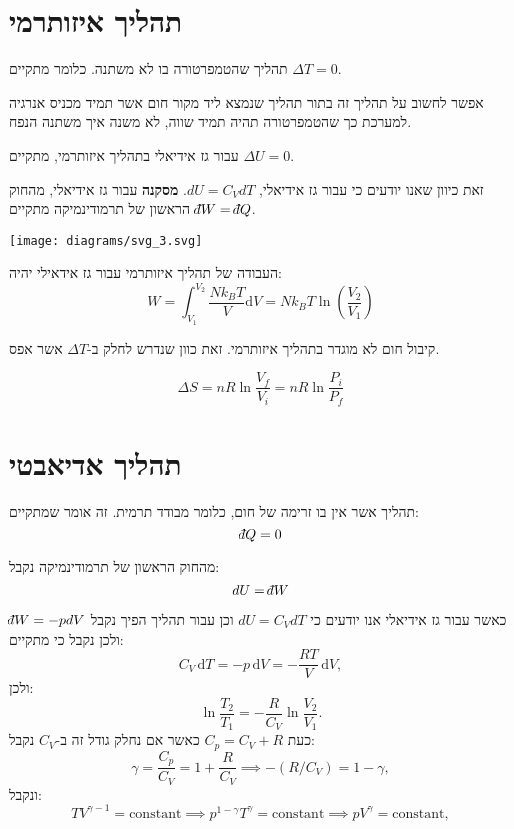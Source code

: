 \documentclass{tstextbook}
\begin{document}
\section{תהליך איזותרמי}

\begin{definition}
תהליך שהטמפרטורה בו לא משתנה. כלומר מתקיים \(\Delta T=0\).

\end{definition}
אפשר לחשוב על תהליך זה בתור תהליך שנמצא ליד מקור חום אשר תמיד מכניס אנרגיה למערכת כך שהטמפרטורה תהיה תמיד שווה, לא משנה איך משתנה הנפח.

\begin{proposition}
עבור גז אידיאלי בתהליך איזותרמי, מתקיים \(\Delta U=0\).

\end{proposition}
זאת כיוון שאנו יודעים כי עבור גז אידיאלי,  \(dU=C_{V}dT\).
\textbf{מסקנה}
עבור גז אידיאלי, מהחוק הראשון של תרמודינמיקה מתקיים \(\;\bar{}\mkern-7.5mu dW=\;\bar{}\mkern-7.5mu dQ\).

\texttt{[image: diagrams/svg\_3.svg]}
\begin{proposition}
העבודה של תהליך איזותרמי עבור גז אידאילי יהיה:
$$W=\int_{V_{1}}^{V_{2}} \frac{Nk_{B}T}{V} \mathrm{d}V=Nk_{B}T\ln\left( \frac{V_{2}}{V_{1}} \right)$$

\end{proposition}
\begin{remark}
קיבול חום לא מוגדר בתהליך איזותרמי. זאת כוון שנדרש לחלק ב-\(\Delta T\) אשר אפס.

\end{remark}
\begin{proposition}
$$\Delta S=n R\ln{\frac{V_{f}}{V_{i}}}=n R\ln{\frac{P_{i}}{P_{f}}}$$

\end{proposition}
\section{תהליך אדיאבטי}

\begin{definition}
תהליך אשר אין בו זרימה של חום, כלומר מבודד תרמית. זה אומר שמתקיים:
$$\;\bar{}\mkern-7.5mu dQ=0$$

\end{definition}
\begin{corollary}
מהחוק הראשון של תרמודינמיקה נקבל:
$$dU=\;\bar{}\mkern-7.5mu dW$$

\end{corollary}
כאשר עבור גז אידיאלי אנו יודעים כי \(dU=C_{V}dT\) וכן עבור תהליך הפיך נקבל \(\;\bar{}\mkern-7.5mu dW=-pdV\) ולכן נקבל כי מתקיים:
$$C_{V}\,\mathrm{d}T=-p\,\mathrm{d}V=-{\frac{R T}{V}}\,\mathrm{d}V,$$
ולכן:
$$\ln\frac{T_{2}}{T_{1}}=-\frac{R}{C_{V}}\ln\frac{V_{2}}{V_{1}}.$$
כעת \(C_{p}=C_{V}+R\) כאשר אם נחלק גודל זה ב-\(C_{V}\) נקבל:
$$\gamma=\frac{C_{p}}{C_{V}}=1+\frac{R}{C_{V}}\implies-(R/C_{V})=1-\gamma,$$
ונקבל:
$$T V^{\gamma-1}={\mathrm{constant}} \implies p^{1-\gamma}T^{\gamma}=\mathrm{constant}\implies p V^{\gamma}={\mathrm{constant}},$$
\end{document}
